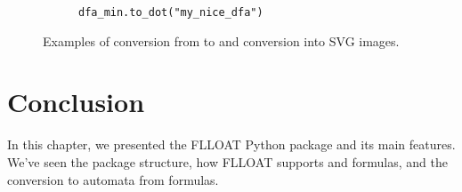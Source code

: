 \begin{figure}[h]
\begin{subfigure}[b]{0.40\textwidth}
		\caption{\texttt{dfa\_min.to\_dot("my\_nice\_dfa")}}
		\label{fig:flloat-to_automaton-example-my-nice-dfa}
	\end{subfigure}
	\caption{Examples of conversion from \LLf to \DFA and conversion into SVG images.}
\end{figure}

\section{Conclusion}
In this chapter, we presented the FLLOAT Python package and its main features. We've seen the package structure, how FLLOAT supports \PL and \LLf formulas, and the conversion to automata from \LLf formulas.